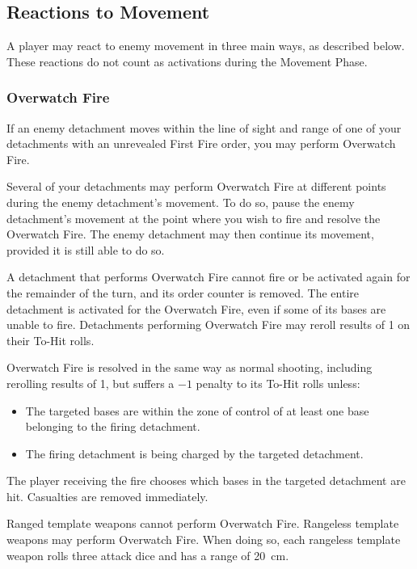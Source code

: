 \subsection{Reactions to Movement}

A player may react to enemy movement in three main ways, as described below. These reactions do not count as activations during the Movement Phase.

\subsubsection{Overwatch Fire}

If an enemy detachment moves within the line of sight and range of one of your detachments with an unrevealed First Fire order, you may perform Overwatch Fire.

Several of your detachments may perform Overwatch Fire at different points during the enemy detachment's movement. To do so, pause the enemy detachment's movement at the point where you wish to fire and resolve the Overwatch Fire. The enemy detachment may then continue its movement, provided it is still able to do so.

A detachment that performs Overwatch Fire cannot fire or be activated again for the remainder of the turn, and its order counter is removed. The entire detachment is activated for the Overwatch Fire, even if some of its bases are unable to fire. Detachments performing Overwatch Fire may reroll results of 1 on their To-Hit rolls.

Overwatch Fire is resolved in the same way as normal shooting, including rerolling results of 1, but suffers a $-1$ penalty to its To-Hit rolls unless:

\begin{itemize}
    \item The targeted bases are within the zone of control of at least one base belonging to the firing detachment.
    \item The firing detachment is being charged by the targeted detachment.
\end{itemize}

The player receiving the fire chooses which bases in the targeted detachment are hit. Casualties are removed immediately.

Ranged template weapons cannot perform Overwatch Fire. Rangeless template weapons may perform Overwatch Fire. When doing so, each rangeless template weapon rolls three attack dice and has a range of 20~cm.

